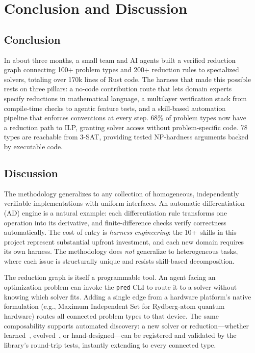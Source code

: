 \documentclass[conference]{IEEEtran}
\begin{document}
\section{Conclusion and Discussion}\label{sec:conclusion}

\subsection{Conclusion}

In about three months, a small team and AI agents built a verified reduction graph connecting 100+ problem types and 200+ reduction rules to specialized solvers, totaling over 170k lines of Rust code.
The harness that made this possible rests on three pillars: a no-code contribution route that lets domain experts specify reductions in mathematical language, a multilayer verification stack from compile-time checks to agentic feature tests, and a skill-based automation pipeline that enforces conventions at every step.
68\% of problem types now have a reduction path to ILP, granting solver access without problem-specific code.
78 types are reachable from 3-SAT, providing tested NP-hardness arguments backed by executable code.

\subsection{Discussion}

The methodology generalizes to any collection of homogeneous, independently verifiable implementations with uniform interfaces.
An automatic differentiation (AD) engine is a natural example: each differentiation rule transforms one operation into its derivative, and finite-difference checks verify correctness automatically.
The cost of entry is \emph{harness engineering}: the 10+~skills in this project represent substantial upfront investment, and each new domain requires its own harness.
The methodology does \emph{not} generalize to heterogeneous tasks, where each issue is structurally unique and resists skill-based decomposition.

The reduction graph is itself a programmable tool.
An agent facing an optimization problem can invoke the \texttt{pred} CLI to route it to a solver without knowing which solver fits.
Adding a single edge from a hardware platform's native formulation (e.g., Maximum Independent Set for Rydberg-atom quantum hardware) routes all connected problem types to that device.
The same composability supports automated discovery: a new solver or reduction---whether learned~\cite{Ye2024ReEvo}, evolved~\cite{Novikov2025AlphaEvolve}, or hand-designed---can be registered and validated by the library's round-trip tests, instantly extending to every connected type.
\end{document}
